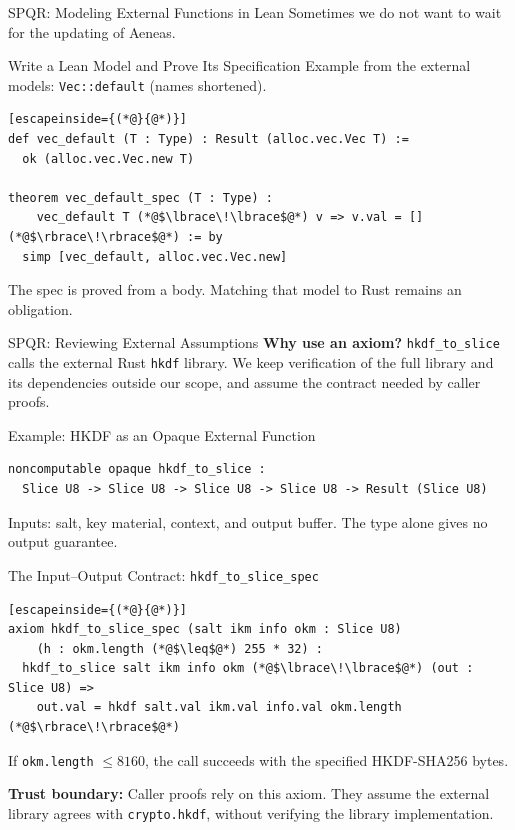 \documentclass[aspectratio=169,xcolor=dvipsnames]{beamer}
\begin{document}
\begin{frame}[fragile]{SPQR: Modeling External Functions in Lean}
 Sometimes we do not want to wait for the updating of Aeneas.
    \footnotesize
    \begin{block}{Write a Lean Model and Prove Its Specification}
        Example from the external models: \texttt{Vec::default} (names shortened).
\begin{lstlisting}[escapeinside={(*@}{@*)}]
def vec_default (T : Type) : Result (alloc.vec.Vec T) :=
  ok (alloc.vec.Vec.new T)

theorem vec_default_spec (T : Type) :
    vec_default T (*@$\lbrace\!\lbrace$@*) v => v.val = [] (*@$\rbrace\!\rbrace$@*) := by
  simp [vec_default, alloc.vec.Vec.new]
\end{lstlisting}
        The spec is proved from a body. Matching that model to Rust remains an obligation.
    \end{block}
\end{frame}

\begin{frame}[fragile]{SPQR: Reviewing External Assumptions}
    \footnotesize
    \textbf{Why use an axiom?} \texttt{hkdf\_to\_slice} calls the external Rust \texttt{hkdf} library.
    We keep verification of the full library and its dependencies outside our scope,
    and assume the contract needed by caller proofs.
    \begin{block}{Example: HKDF as an Opaque External Function}
\begin{lstlisting}
noncomputable opaque hkdf_to_slice :
  Slice U8 -> Slice U8 -> Slice U8 -> Slice U8 -> Result (Slice U8)
\end{lstlisting}
        Inputs: salt, key material, context, and output buffer. The type alone gives no output guarantee.
    \end{block}
    \begin{block}{The Input--Output Contract: \texttt{hkdf\_to\_slice\_spec}}
\begin{lstlisting}[escapeinside={(*@}{@*)}]
axiom hkdf_to_slice_spec (salt ikm info okm : Slice U8)
    (h : okm.length (*@$\leq$@*) 255 * 32) :
  hkdf_to_slice salt ikm info okm (*@$\lbrace\!\lbrace$@*) (out : Slice U8) =>
    out.val = hkdf salt.val ikm.val info.val okm.length (*@$\rbrace\!\rbrace$@*)
\end{lstlisting}
        If \texttt{okm.length} $\leq 8160$, the call succeeds with the specified HKDF-SHA256 bytes.
    \end{block}
    \textbf{Trust boundary:} Caller proofs rely on this axiom. They assume the external
    library agrees with \texttt{crypto.hkdf}, without verifying the library implementation.
\end{frame}
\end{document}
